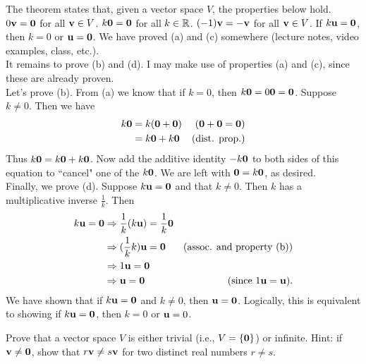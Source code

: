 \begin{solution}
\noindent
The theorem states that, given a vector space $V$, the properties below hold. 
\bb[(a)]
\ii $0{\mathbf v}={\mathbf 0}$ for all ${\mathbf v}\in V$. 
\ii $k{\mathbf 0}={\mathbf 0}$ for all $k\in {\mathbb R}$. 
\ii $(-1){\mathbf v}=-{\mathbf v}$ for all ${\mathbf v}\in V$. 
\ii If $k{\mathbf u}={\mathbf 0}$, then $k=0$ or ${\mathbf u}={\mathbf 0}$. 
\ee
We have proved (a) and (c) somewhere (lecture notes, video examples, class, etc.).
\\
It remains to prove (b) and (d). I may make use of properties (a) and (c), since these are already proven. 
\\
Let's prove (b). From (a) we know that if $k=0$, then $k{\mathbf 0}=0{\mathbf 0}={\mathbf 0}$. Suppose $k\ne 0$. Then we have 
\begin{align*}
k{\mathbf 0}&=k({\mathbf 0}+{\mathbf 0}) &\text{(${\mathbf 0}+{\mathbf 0}={\mathbf 0}$)}\\
&=k{\mathbf 0}+k{\mathbf 0} &\text{(dist. prop.)}
\end{align*}
Thus $k{\mathbf 0}=k{\mathbf 0}+k{\mathbf 0}$. Now add the additive identity $-k{\mathbf 0}$ to both sides of this equation to ``cancel" one of the $k{\mathbf 0}$. We are left with ${\mathbf 0}=k{\mathbf 0}$, as desired. 
\vspace{.1in}
\\
Finally, we prove (d). Suppose $k{\mathbf u}={\mathbf 0}$ and that $k\ne 0$. Then $k$ has a multiplicative inverse $\frac{1}{k}$. Then 
\begin{align*}
k{\mathbf u}={\mathbf 0}&\Rightarrow \frac{1}{k}(k{\mathbf u})=\frac{1}{k}{\mathbf 0}\\
&\Rightarrow (\frac{1}{k}k){\mathbf u}={\mathbf 0} &\text{(assoc. and property (b))}\\
&\Rightarrow 1{\mathbf u}={\mathbf 0}\\
&\Rightarrow {\mathbf u}={\mathbf 0} &\text{(since $1{\mathbf u}={\mathbf u}$)}.
\end{align*}
We have shown that if $k{\mathbf u}={\mathbf 0}$ and $k\ne 0$, then ${\mathbf u}={\mathbf 0}$. Logically, this is equivalent to showing if $k{\mathbf u}={\mathbf 0}$, then $k=0$ or ${\mathbf u}=0$. 
\end{solution}
\ii Prove that a vector space $V$ is either trivial (i.e., $V=\{{\mathbf 0}\}$) or infinite. Hint: if ${\mathbf v}\ne{\mathbf 0}$, show that $r{\mathbf v}\ne s{\mathbf v}$ for two distinct real numbers $r\ne s$. 
